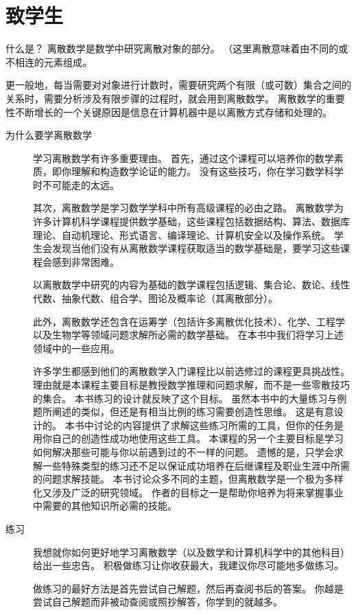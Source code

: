 \chapter{致学生}
{
    什么是？
    离散数学是数学中研究离散对象的部分。
    （这里离散意味着由不同的或不相连的元素组成。

    更一般地，每当需要对对象进行计数时，需要研究两个有限（或可数）集合之间的关系时，需要分析涉及有限步骤的过程时，就会用到离散数学。
    离散数学的重要性不断增长的一个关键原因是信息在计算机器中是以离散方式存储和处理的。

    \begin{description}
        \item[为什么要学离散数学]
        {
            学习离散数学有许多重要理由。
            首先，通过这个课程可以培养你的数学素质，即你理解和构造数学论证的能力。
            没有这些技巧，你在学习数学科学时不可能走的太远。
            
            其次，离散数学是学习数学学科中所有高级课程的必由之路。
            离散数学为许多计算机科学课程提供数学基础，这些课程包括数据结构、算法、数据库理论、自动机理论、形式语言、编译理论、计算机安全以及操作系统。
            学生会发现当他们没有从离散数学课程获取适当的数学基础是，要学习这些课程会感到非常困难。

            以离散数学中研究的内容为基础的数学课程包括逻辑、集合论、数论、线性代数、抽象代数、组合学、图论及概率论（其离散部分）。

            此外，离散数学还包含在运筹学（包括许多离散优化技术）、化学、工程学以及生物学等领域问题求解所必需的数学基础。
            在本书中我们将学习上述领域中的一些应用。

            许多学生都感到他们的离散数学入门课程比以前选修过的课程更具挑战性。
            理由就是本课程主要目标是教授数学推理和问题求解，而不是一些零散技巧的集合。
            本书练习的设计就反映了这个目标。
            虽然本书中的大量练习与例题所阐述的类似，但还是有相当比例的练习需要创造性思维。
            这是有意设计的。
            本书中讨论的内容提供了求解这些练习所需的工具，但你的任务是用你自己的创造性成功地使用这些工具。
            本课程的另一个主要目标是学习如何解决那些可能与你以前遇到过的不一样的问题。
            遗憾的是，只学会求解一些特殊类型的练习还不足以保证成功培养在后继课程及职业生涯中所需的问题求解技能。
            本书讨论众多不同的主题，但离散数学是一个极为多样化又涉及广泛的研究领域。
            作者的目标之一是帮助你培养为将来掌握事业中需要的其他知识所必需的技能。
        }
        \item[练习]
        {
            我想就你如何更好地学习离散数学（以及数学和计算机科学中的其他科目）给出一些忠告。
            积极做练习让你收获最大，我建议你尽可能地多做练习。

            做练习的最好方法是首先尝试自己解题，然后再查阅书后的答案。
            你越是尝试自己解题而非被动查阅或照抄解答，你学到的就越多。
        }
    \end{description}
}

\cleardoublepage

\endinput
